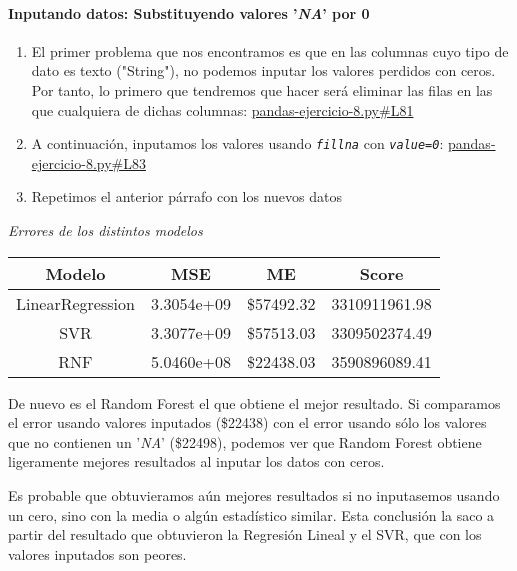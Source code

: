 \documentclass[
12pt, 
spanish, 
singlespacing,
headsepline
]{article}
\begin{document}
\paragraph{Inputando datos: Substituyendo valores '\textit{NA}' por 0}
\begin{enumerate}
\item El primer problema que nos encontramos es que en las columnas cuyo tipo de dato es texto ("String"), no podemos inputar los valores perdidos con ceros. Por tanto, lo primero que tendremos que hacer será eliminar las filas en las que cualquiera de dichas columnas: \href{https://github.com/uo272509/InteligenciaNegocioPL/blob/c43eff60b8bcd5372c221600c31fed0eea01aec5/Prac1/Parte\%203/pandas-ejercicio-8.py\#L81}{pandas-ejercicio-8.py\#L81}

\item A continuación, inputamos los valores usando \texttt{\textit{fillna}} con \texttt{\textit{value=0}}: \href{https://github.com/uo272509/InteligenciaNegocioPL/blob/c43eff60b8bcd5372c221600c31fed0eea01aec5/Prac1/Parte\%203/pandas-ejercicio-8.py\#L83}{pandas-ejercicio-8.py\#L83}

\item Repetimos el anterior párrafo con los nuevos datos
\end{enumerate}
\begin{center}
\emph{Errores de los distintos modelos}\\
\begin{tabular}{|c|c|c|c|}
\hline 
Modelo & MSE & ME & Score \\ 
\hline 
LinearRegression & 3.3054e+09 & \$57492.32 &  3310911961.98\\ 
\hline 
SVR & 3.3077e+09 & \$57513.03 & 3309502374.49\\ 
\hline 
RNF & 5.0460e+08 & \$22438.03 & 3590896089.41 \\ 
\hline 
\end{tabular} 
\end{center}

De nuevo es el Random Forest el que obtiene el mejor resultado. Si comparamos el error usando valores inputados (\$22438) con el error usando sólo los valores que no contienen un '\textit{NA}' (\$22498), podemos ver que Random Forest obtiene ligeramente mejores resultados al inputar los datos con ceros.

Es probable que obtuvieramos aún mejores resultados si no inputasemos usando un cero, sino con la media o algún estadístico similar. Esta conclusión la saco a partir del resultado que obtuvieron la Regresión Lineal y el SVR, que con los valores inputados son peores.
\end{document}
